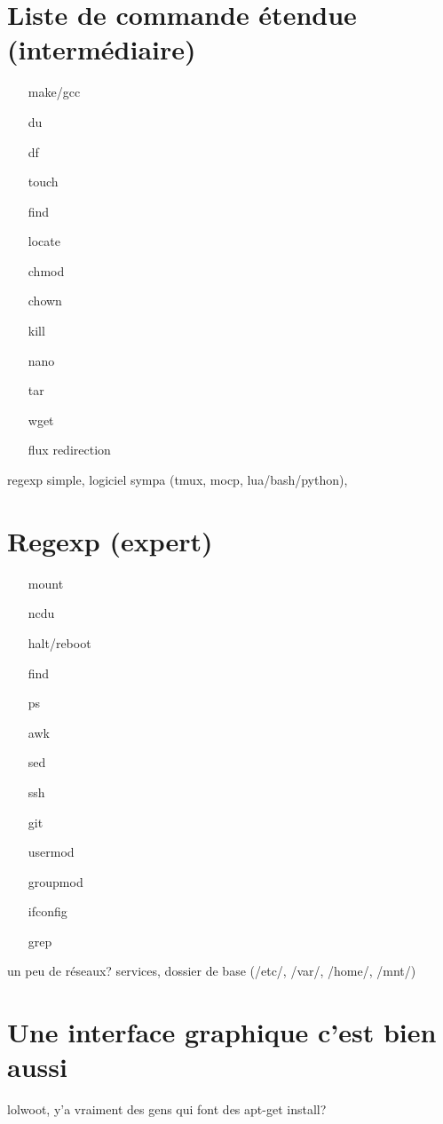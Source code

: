 \documentclass[french, a4paper, 12pt, titlepage]{article}
\begin{document}
\section{Liste de commande étendue (intermédiaire)}
\begin{enumerate}
\item[make/gcc]
\item[du]
\item[df]
\item[touch]
\item[find]
\item[locate]
\item[chmod]
\item[chown]
\item[kill]
\item[nano]
\item[tar]
\item[wget]
\item[flux redirection]
\end{enumerate}
regexp simple, logiciel sympa (tmux, mocp, lua/bash/python),

\section{Regexp (expert)}
\begin{enumerate}
\item[mount]
\item[ncdu]
\item[halt/reboot]
\item[find]
\item[ps]
\item[awk]
\item[sed]
\item[ssh]
\item[git]
\item[usermod]
\item[groupmod]
\item[ifconfig]
\item[grep]
\end{enumerate}
un peu de réseaux? services,
dossier de base (/etc/, /var/, /home/, /mnt/)

\section{Une interface graphique c'est bien aussi}
lolwoot, y'a vraiment des gens qui font des apt-get install? 
\end{document}
